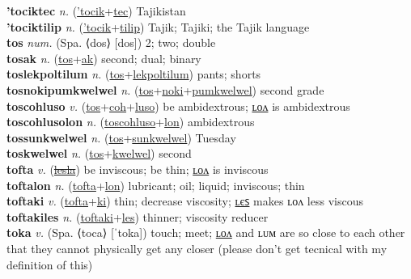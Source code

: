 \textbf{'tociktec} \textit{n.} (\hyperref['tocik]{'tocik}+\hyperref[tec]{tec})
Tajikistan \label{'tociktec} \\
\textbf{'tociktilip} \textit{n.} (\hyperref['tocik]{'tocik}+\hyperref[tilip]{tilip})
Tajik; Tajiki; the Tajik language \label{'tociktilip} \\
\textbf{tos} \textit{num.} (Spa. ⟨dos⟩ [dos])
2; two; double \label{tos} \\
\textbf{tosak} \textit{n.} (\hyperref[tos]{tos}+\hyperref[ak]{ak})
second; dual; binary \label{tosak} \\
\textbf{toslekpoltilum} \textit{n.} (\hyperref[tos]{tos}+\hyperref[lekpoltilum]{lekpoltilum})
pants; shorts \label{toslekpoltilum} \\
\textbf{tosnokipumkwelwel} \textit{n.} (\hyperref[tos]{tos}+\hyperref[noki]{noki}+\hyperref[pumkwelwel]{pumkwelwel})
second grade \label{tosnokipumkwelwel} \\
\textbf{toscohluso} \textit{v.} (\hyperref[tos]{tos}+\hyperref[coh]{coh}+\hyperref[luso]{luso})
be ambidextrous; \hyperref[toscohlusolon]{ʟᴏᴧ} is ambidextrous \label{toscohluso} \\
\textbf{toscohlusolon} \textit{n.} (\hyperref[toscohluso]{toscohluso}+\hyperref[lon]{lon})
ambidextrous \label{toscohlusolon} \\
\textbf{tossunkwelwel} \textit{n.} (\hyperref[tos]{tos}+\hyperref[sunkwelwel]{sunkwelwel})
Tuesday \label{tossunkwelwel} \\
\textbf{toskwelwel} \textit{n.} (\hyperref[tos]{tos}+\hyperref[kwelwel]{kwelwel})
second \label{toskwelwel} \\
\textbf{tofta} \textit{v.} (\hyperref[lesla]{\sout{lesla}})
be inviscous; be thin; \hyperref[toftalon]{ʟᴏᴧ} is inviscous \label{tofta} \\
\textbf{toftalon} \textit{n.} (\hyperref[tofta]{tofta}+\hyperref[lon]{lon})
lubricant; oil; liquid; inviscous; thin \label{toftalon} \\
\textbf{toftaki} \textit{v.} (\hyperref[tofta]{tofta}+\hyperref[ki]{ki})
thin; decrease viscosity; \hyperref[toftakiles]{ʟєꜱ} makes ʟᴏᴧ less viscous \label{toftaki} \\
\textbf{toftakiles} \textit{n.} (\hyperref[toftaki]{toftaki}+\hyperref[les]{les})
thinner; viscosity reducer \label{toftakiles} \\
\textbf{toka} \textit{v.} (Spa. ⟨toca⟩ [ˈtoka])
touch; meet; \hyperref[tokalon]{ʟᴏᴧ} and ʟᴜᴍ are so close to each other that they cannot physically get any closer (please don’t get tecnical with my definition of this) \label{toka} \\
